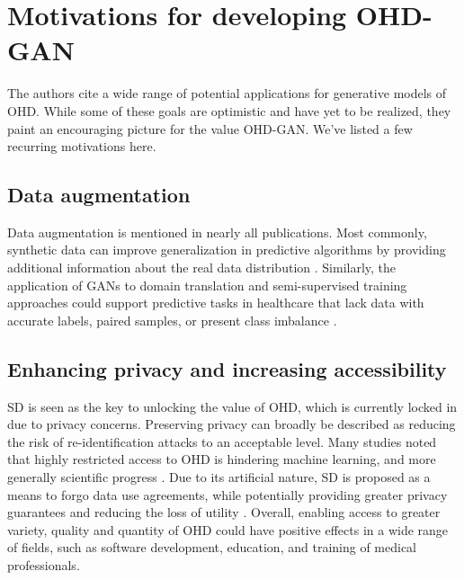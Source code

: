 \section{Motivations for developing OHD-GAN}
The authors cite a wide range of potential applications for generative models of OHD. While some of these goals are optimistic and have yet to be realized, they paint an encouraging picture for the value OHD-GAN. We've listed a few recurring motivations here. 
\subsection{Data augmentation}
Data augmentation is mentioned in nearly all publications. Most commonly, synthetic data can improve generalization in predictive algorithms by providing additional information about the real data distribution \cite{Wang_2019,Che_2017,Yoon2018-dm, Yoon2018-mo}. Similarly, the application of GANs to domain translation and semi-supervised training approaches could support predictive tasks in healthcare that lack data with accurate labels, paired samples, or present class imbalance \cite{Che_2017,mcdermott2018semi}. 
\subsection{Enhancing privacy and increasing accessibility}
SD is seen as the key to unlocking the value of OHD, which is currently locked in due to privacy concerns. Preserving privacy can broadly be described as reducing the risk of re-identification attacks to an acceptable level. Many studies noted that highly restricted access to OHD is hindering machine learning, and more generally scientific progress \cite{Beaulieu-Jones2019-ct, Baowaly_2019,Che_2017,esteban2017real,Fisher2019}. Due to its artificial nature, SD is proposed as a means to forgo data use agreements, while potentially providing greater privacy guarantees and reducing the loss of utility \cite{Beaulieu-Jones2019-ct, Baowaly_2019,esteban2017real,Fisher2019,walsh2020generating}. Overall, enabling access to greater variety, quality and quantity of OHD could have positive effects in a wide range of fields, such as software development, education, and training of medical professionals. 
